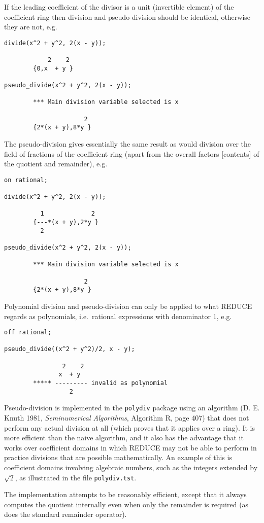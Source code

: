If the leading coefficient of the divisor is a unit (invertible
element) of the coefficient ring then division and pseudo-division
should be identical, otherwise they are not, e.g.
\begin{verbatim}
divide(x^2 + y^2, 2(x - y));

            2    2
        {0,x  + y }

pseudo_divide(x^2 + y^2, 2(x - y));

        *** Main division variable selected is x

                      2
        {2*(x + y),8*y }
\end{verbatim}

The pseudo-division gives essentially the same result as would
division over the field of fractions of the coefficient ring (apart
from the overall factors [contents] of the quotient and remainder),
e.g.
\begin{verbatim}
on rational;

divide(x^2 + y^2, 2(x - y));

          1             2
        {---*(x + y),2*y }
          2

pseudo_divide(x^2 + y^2, 2(x - y));

        *** Main division variable selected is x

                      2
        {2*(x + y),8*y }
\end{verbatim}

Polynomial division and pseudo-division can only be applied to what
REDUCE regards as polynomials, i.e.\ rational expressions with
denominator 1, e.g.
\begin{verbatim}
off rational;

pseudo_divide((x^2 + y^2)/2, x - y);

                2    2
               x  + y
        ***** --------- invalid as polynomial
                  2
\end{verbatim}

Pseudo-division is implemented in the \texttt{polydiv} package using
an algorithm (D. E. Knuth 1981, \textit{Seminumerical Algorithms},
Algorithm R, page 407) that does not perform any actual division at
all (which proves that it applies over a ring).  It is more efficient
than the naive algorithm, and it also has the advantage that it works
over coefficient domains in which REDUCE may not be able to perform in
practice divisions that are possible mathematically.  An example of
this is coefficient domains involving algebraic numbers, such as the
integers extended by $\sqrt{2}$, as illustrated in the file
\texttt{polydiv.tst}.

The implementation attempts to be reasonably efficient, except that it
always computes the quotient internally even when only the remainder
is required (as does the standard remainder operator).

